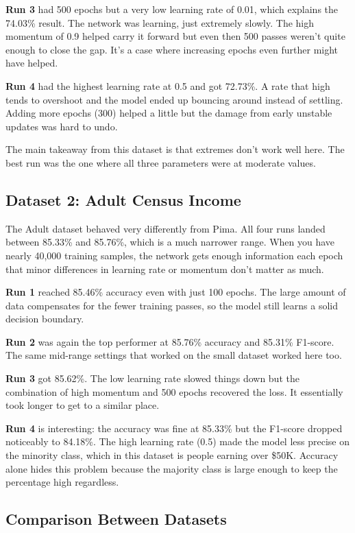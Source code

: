 \documentclass[12pt,a4paper]{article}
\begin{document}
\textbf{Run 3} had 500 epochs but a very low learning rate of 0.01, which
explains the 74.03\% result. The network was learning, just extremely slowly.
The high momentum of 0.9 helped carry it forward but even then 500 passes
weren't quite enough to close the gap. It's a case where increasing epochs
even further might have helped.

\textbf{Run 4} had the highest learning rate at 0.5 and got 72.73\%. A rate
that high tends to overshoot and the model ended up bouncing around instead of
settling. Adding more epochs (300) helped a little but the damage from early
unstable updates was hard to undo.

The main takeaway from this dataset is that extremes don't work well here.
The best run was the one where all three parameters were at moderate values.

\subsection{Dataset 2: Adult Census Income}

The Adult dataset behaved very differently from Pima. All four runs landed
between 85.33\% and 85.76\%, which is a much narrower range. When you have
nearly 40,000 training samples, the network gets enough information each epoch
that minor differences in learning rate or momentum don't matter as much.

\textbf{Run 1} reached 85.46\% accuracy even with just 100 epochs. The large
amount of data compensates for the fewer training passes, so the model still
learns a solid decision boundary.

\textbf{Run 2} was again the top performer at 85.76\% accuracy and 85.31\%
F1-score. The same mid-range settings that worked on the small dataset worked
here too.

\textbf{Run 3} got 85.62\%. The low learning rate slowed things down but the
combination of high momentum and 500 epochs recovered the loss. It essentially
took longer to get to a similar place.

\textbf{Run 4} is interesting: the accuracy was fine at 85.33\% but the
F1-score dropped noticeably to 84.18\%. The high learning rate (0.5) made the
model less precise on the minority class, which in this dataset is people
earning over \$50K. Accuracy alone hides this problem because the majority
class is large enough to keep the percentage high regardless.

\subsection{Comparison Between Datasets}
\end{document}
